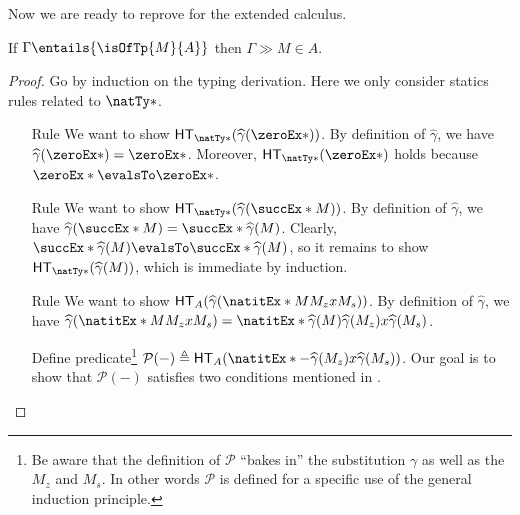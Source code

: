 \documentclass[letterpaper]{article}
\begin{document}
Now we are ready to reprove  for the extended calculus.

\begin{theorem}\label{thm:fundamental-nat}
If $\Gamma \entails{\isOfTp{M}{A}}$ then $\Gamma \gg M \in A$.
\end{theorem}
\begin{proof}
Go by induction on the typing derivation. Here we only consider statics rules related to $\natTy*$.
\begin{enumerate}
  \item [Rule \ruleref{sta:zero}] We want to show $\HT[\natTy*](\widehat{\gamma}(\zeroEx*))$. By definition of $\widehat{\gamma}$, we have $\widehat{\gamma}(\zeroEx*) = \zeroEx*$. Moreover, $\HT[\natTy*](\zeroEx*)$ holds because $\zeroEx* \evalsTo \zeroEx*$.
  \item [Rule \ruleref{sta:succ}] We want to show $\HT[\natTy*](\widehat{\gamma}(\succEx*{M}))$. By definition of $\widehat{\gamma}$, we have $\widehat{\gamma}(\succEx*{M}) = \succEx*{\widehat{\gamma}(M)}$. Clearly, $\succEx*{\widehat{\gamma}(M)} \evalsTo \succEx*{\widehat{\gamma}(M)}$, so it remains to show $\HT[\natTy*](\widehat{\gamma}(M))$, which is immediate by induction.
  \item [Rule \ruleref{sta:natit}] We want to show $\HT[A](\widehat{\gamma}(\natitEx*{M}{M_z}{x}{M_s}))$. By definition of $\widehat{\gamma}$, we have $\widehat{\gamma}(\natitEx*{M}{M_z}{x}{M_s}) = \natitEx*{\widehat{\gamma}(M)}{\widehat{\gamma}(M_z)}{x}{\widehat{\gamma}(M_s)}$.

  Define predicate\footnote{Be aware that the definition of $\mathcal{P}$ ``bakes in'' the substitution $\gamma$ as well as the $M_z$ and $M_s$.
  In other words $\mathcal{P}$ is defined for a specific use of the general induction principle.} $\mathcal{P}(-) \triangleq \HT[A](\natitEx*{-}{\widehat{\gamma}(M_z)}{x}{\widehat{\gamma}(M_s)})$. Our goal is to show that $\mathcal{P}(-)$ satisfies two conditions mentioned in .


\end{enumerate}
\end{proof}
\end{document}
